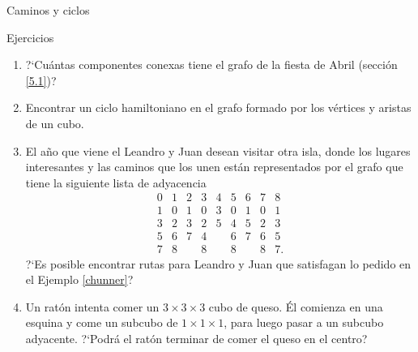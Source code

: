 \documentclass[11pt,spanish,makeidx]{amsbook}
\theoremstyle{definition}
\theoremstyle{remark}
\begin{document}
\begin{section}{Caminos y ciclos}
\begin{subsection}{Ejercicios}
\begin{enumerate}
\item ?`Cuántas componentes conexas tiene el grafo de la fiesta de Abril (sección \ref{5.1})?
\item Encontrar un ciclo hamiltoniano en el grafo formado por los vértices y aristas de un
cubo.
\item El año que viene el Leandro y Juan desean visitar otra isla, donde los lugares interesantes y las caminos que los unen están representados por el grafo que tiene la siguiente lista de adyacencia
$$
\begin{matrix}
0&1&2&3&4&5&6&7&8\\ \hline
1&0&1&0&3&0&1&0&1\\
3&2&3&2&5&4&5&2&3\\
5&6&7&4&&6&7&6&5\\
7&8&&8&&8&&8&7.
\end{matrix}
$$
?`Es posible encontrar rutas para Leandro y Juan que satisfagan lo pedido en el  Ejemplo \ref{chunner}?
\item Un ratón intenta comer un $3\times 3\times 3$ cubo de queso. Él comienza en una esquina y come un subcubo de $1\times 1\times 1$, para luego pasar a un subcubo  adyacente. ?`Podrá el ratón terminar de comer el queso en el centro?
\end{enumerate}
\end{subsection}

\end{section}
\end{document}
